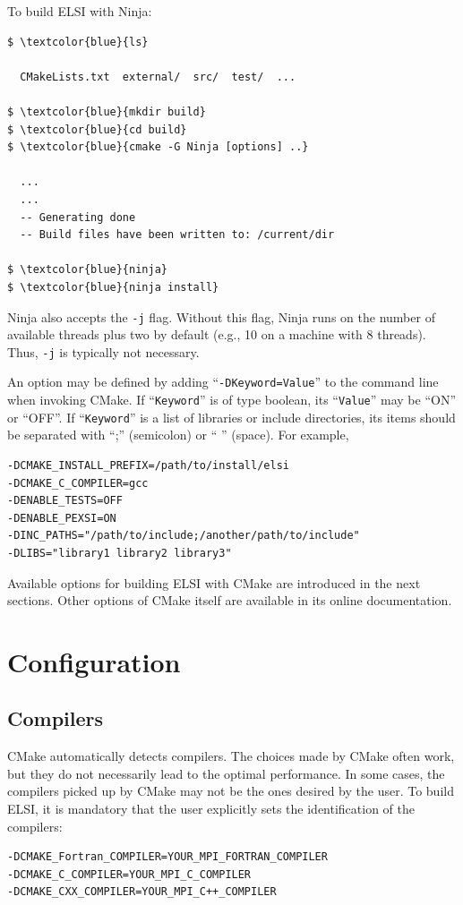 \documentclass{report}
\begin{document}
To build ELSI with Ninja:
\begin{tcolorbox}
\begin{Verbatim}[commandchars=\\\{\}]
$ \textcolor{blue}{ls}

  CMakeLists.txt  external/  src/  test/  ...

$ \textcolor{blue}{mkdir build}
$ \textcolor{blue}{cd build}
$ \textcolor{blue}{cmake -G Ninja [options] ..}

  ...
  ...
  -- Generating done
  -- Build files have been written to: /current/dir

$ \textcolor{blue}{ninja}
$ \textcolor{blue}{ninja install}
\end{Verbatim}
\end{tcolorbox}

Ninja also accepts the \verb+-j+ flag.  Without this flag, Ninja runs on the number of available threads plus two by default (e.g., 10 on a machine with 8 threads).  Thus, \verb+-j+ is typically not necessary.

An option may be defined by adding ``\verb+-DKeyword=Value+'' to the command line when invoking CMake.  If ``\verb+Keyword+'' is of type boolean, its ``\verb+Value+'' may be ``ON'' or ``OFF''.  If ``\verb+Keyword+'' is a list of libraries or include directories, its items should be separated with ``;'' (semicolon) or `` '' (space).  For example,
\begin{tcolorbox}
\begin{verbatim}
-DCMAKE_INSTALL_PREFIX=/path/to/install/elsi
-DCMAKE_C_COMPILER=gcc
-DENABLE_TESTS=OFF
-DENABLE_PEXSI=ON
-DINC_PATHS="/path/to/include;/another/path/to/include"
-DLIBS="library1 library2 library3"
\end{verbatim}
\end{tcolorbox}

Available options for building ELSI with CMake are introduced in the next sections.  Other options of CMake itself are available in its online documentation.

\section{Configuration}
\label{sec:config}
\subsection{Compilers}
\label{subsec:config_compilers}
CMake automatically detects compilers.  The choices made by CMake often work, but they do not necessarily lead to the optimal performance.  In some cases, the compilers picked up by CMake may not be the ones desired by the user.  To build ELSI, it is mandatory that the user explicitly sets the identification of the compilers:
\begin{tcolorbox}
\begin{verbatim}
-DCMAKE_Fortran_COMPILER=YOUR_MPI_FORTRAN_COMPILER
-DCMAKE_C_COMPILER=YOUR_MPI_C_COMPILER
-DCMAKE_CXX_COMPILER=YOUR_MPI_C++_COMPILER
\end{verbatim}
\end{tcolorbox}
\end{document}
